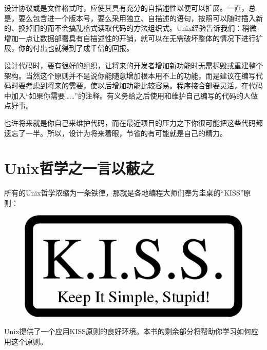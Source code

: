 \documentclass[12pt,oneside]{book}
\begin{document}
设计协议或是文件格式时，应使其具有充分的自描述性以便可以扩展。一直，总是，要么包含进一个版本号，要么采用独立、自描述的语句，按照可以随时插入新的、换掉旧的而不会搞乱格式读取代码的方法组织式。Unix经验告诉我们：稍微增加一点让数据部署具有自描述性的开销，就可以在无需破坏整体的情况下进行扩展，你的付出也就得到了成千倍的回报。

设计代码时，要有很好的组织，让将来的开发者增加新功能时无需拆毁或重建整个架构。当然这个原则并不是说你能随意增加根本用不上的功能，而是建议在编写代码时要考虑到将来的需要，使以后增加功能比较容易。程序接合部要灵活，在代码中加入“如果你需要……”的注释。有义务给之后使用和维护自己编写的代码的人做点好事。

也许将来就是你自己来维护代码，而在最近项目的压力之下你很可能把这些代码都遗忘了一半。所以，设计为将来着眼，节省的有可能就是自己的精力。

\section{Unix哲学之一言以蔽之}
所有的Unix哲学浓缩为一条铁律，那就是各地编程大师们奉为圭桌的“KISS”原则：
\begin{figure}[H]
\centering
\includegraphics[scale=1 , keepaspectratio]{KISS.png}
\end{figure}


Unix提供了一个应用KISS原则的良好环境。本书的剩余部分将帮助你学习如何应用这个原则。
\end{document}
